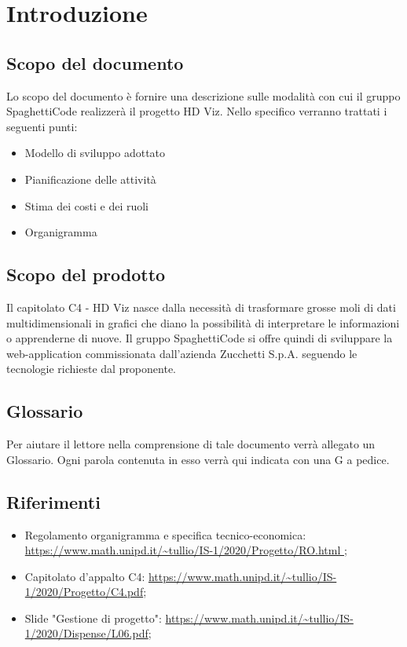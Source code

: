 \documentclass{article}
\begin{document}


\section{Introduzione}%
\label{sec:introduzione}

\subsection{Scopo del documento}%
\label{sub:scopo_del_documento}
Lo scopo del documento è fornire una descrizione sulle modalità con cui il gruppo SpaghettiCode realizzerà il progetto HD Viz. Nello specifico verranno trattati i seguenti punti:
\begin{itemize}
  \item Modello di sviluppo adottato
  \item Pianificazione delle attività
  \item Stima dei costi e dei ruoli
  \item Organigramma 
\end{itemize}

\subsection{Scopo del prodotto}%
\label{sub:scopo_prodotto}
Il capitolato C4 - HD Viz nasce dalla necessità di trasformare grosse moli di dati multidimensionali in grafici che diano la possibilità di interpretare le informazioni o apprenderne di nuove. Il gruppo SpaghettiCode si offre quindi di sviluppare la web-application commissionata dall’azienda Zucchetti S.p.A. seguendo le tecnologie richieste dal proponente. 


\subsection{Glossario}%
\label{sub:glossario}
Per aiutare il lettore nella comprensione di tale documento verrà allegato un Glossario. Ogni parola contenuta in esso verrà qui indicata con una G a pedice.


\subsection{Riferimenti}%
\label{sub:riferimenti}
\begin{itemize}
  \item Regolamento organigramma e specifica tecnico-economica: \url{https://www.math.unipd.it/~tullio/IS-1/2020/Progetto/RO.html };
  \item Capitolato d’appalto C4: \url{https://www.math.unipd.it/~tullio/IS-1/2020/Progetto/C4.pdf};
  \item Slide "Gestione di progetto": \url{https://www.math.unipd.it/~tullio/IS-1/2020/Dispense/L06.pdf};
\end{itemize}
\end{document}
